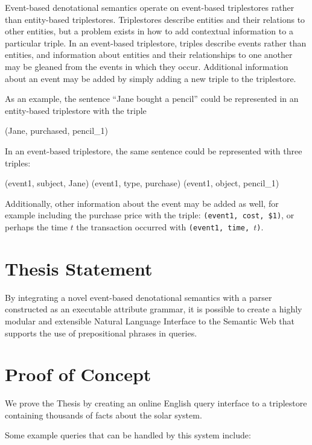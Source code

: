 \documentclass[../main.tex]{subfiles}
\begin{document}
Event-based denotational semantics operate on event-based triplestores\cite{frost2014demonstration} rather than entity-based triplestores.  Triplestores describe entities and their relations to other entities, but a problem exists in how to add contextual information to a particular triple.  In an event-based triplestore, triples describe events rather than entities, and information about entities and their relationships to one another may be gleaned from the events in which they occur.  Additional information about an event may be added by simply adding a new triple to the triplestore.

As an example, the sentence ``Jane bought a pencil'' could be represented in an entity-based triplestore with the triple


\begin{code}
	(Jane, purchased, pencil_1)
\end{code}

In an event-based triplestore, the same sentence could be represented with three triples:

\begin{code}
	(event1, subject, Jane)
	(event1, type, purchase)
	(event1, object, pencil_1)
\end{code}
	
Additionally, other information about the event may be added as well, for example including the purchase price with the triple: \texttt{(event1, cost, \$1)}, or perhaps the time $t$ the transaction occurred with \texttt{(event1, time, $t$)}.  

\section{Thesis Statement}
By integrating a novel event-based denotational semantics with a parser constructed as an executable attribute grammar, it is possible to create a highly modular and extensible Natural Language Interface to the Semantic Web that supports the use of prepositional phrases in queries.

\section{Proof of Concept} We prove the Thesis by creating an online English query interface to a triplestore containing thousands of facts about the solar system\cite{Solarman:2016}.

Some example queries that can be handled by this system include:
\end{document}
